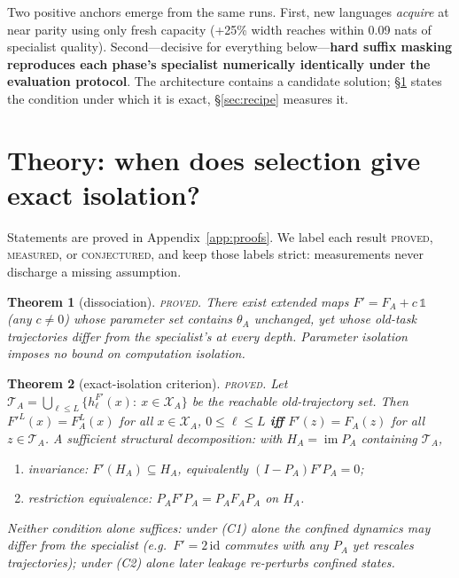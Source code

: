 \documentclass[11pt]{article}
\newtheorem{theorem}{Theorem}
\theoremstyle{definition}\newtheorem{definition}{Definition}
\theoremstyle{remark}\newtheorem{remark}{Remark}
\newcommand{\Xa}{\mathcal{X}_A}
\newcommand{\TA}{\mathcal{T}_A}
\begin{document}
Two positive anchors emerge from the same runs. First, new languages \emph{acquire} at near
parity using only fresh capacity (+25\% width reaches within 0.09 nats of specialist
quality). Second---decisive for everything below---\textbf{hard suffix masking reproduces
each phase's specialist numerically identically under the evaluation protocol}. The
architecture contains a candidate solution; \S\ref{sec:theory} states the condition under
which it is exact, \S\ref{sec:recipe} measures it.

\section{Theory: when does selection give exact isolation?}
\label{sec:theory}

Statements are proved in Appendix~\ref{app:proofs}. We label each result
\textsc{proved}, \textsc{measured}, or \textsc{conjectured}, and keep those labels strict:
measurements never discharge a missing assumption.

\begin{theorem}[dissociation]\label{thm:dissoc}
\textsc{proved.} There exist extended maps $F'=F_A+c\,\mathbb{1}$ (any $c\neq0$) whose
parameter set contains $\theta_A$ unchanged, yet whose old-task trajectories differ from the
specialist's at every depth. Parameter isolation imposes no bound on computation isolation.
\end{theorem}

\begin{theorem}[exact-isolation criterion]\label{thm:criterion}
\textsc{proved.} Let $\TA=\bigcup_{\ell\le L}\{h^{F'}_\ell(x):\ x\in\Xa\}$ be the reachable
old-trajectory set. Then
$F'^L(x)=F_A^L(x)$ for all $x\in\Xa$, $0\le\ell\le L$
\;\textbf{iff}\;
$F'(z)=F_A(z)$ for all $z\in\TA$.
A sufficient structural decomposition: with $H_A=\operatorname{im}P_A$ containing $\TA$,
\begin{enumerate}
\item[(C1)] \emph{invariance}: $F'(H_A)\subseteq H_A$, equivalently $(I-P_A)F'P_A=0$;
\item[(C2)] \emph{restriction equivalence}: $P_AF'P_A = P_AF_AP_A$ on $H_A$.
\end{enumerate}
Neither condition alone suffices: under (C1) alone the confined dynamics may differ from the
specialist (e.g.\ $F'=2\,\mathrm{id}$ commutes with any $P_A$ yet rescales trajectories);
under (C2) alone later leakage re-perturbs confined states.
\end{theorem}
\end{document}
